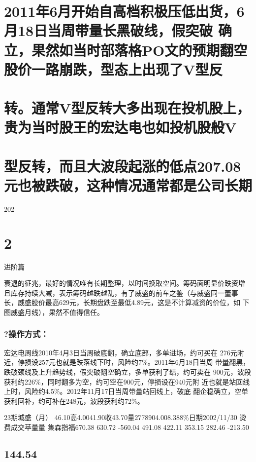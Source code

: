 \documentclass{article}
\begin{document}
\section{2011年6月开始自高档积极压低出货，6月18日当周带量长黑破线，假突破 确立，果然如当时部落格PO文的预期翻空股价一路崩跌，型态上出现了V型反}

\section{转。通常V型反转大多出现在投机股上，贵为当时股王的宏达电也如投机股般V}

\section{型反转，而且大波段起涨的低点207.08元也被跌破，这种情况通常都是公司长期}

202

\clearpage

\section{2}

进阶篇

衰退的征兆，最好的情况唯有长期整理，以时间换取空间。筹码面明显价跌资增 且库存持续大减，表示筹码越跌越乱，有了威盛的前车之鉴（与威盛同一董事 长，威盛股价最高629元，长期盘跌至最低4.89元，这是不计算减资的价位，如 下图威盛月线），果然不值得信任。

\subsubsection{?操作方式：}

宏达电周线2010年4月3日当周破底翻，确立底部，多单进场，约可买在 276元附近，停损设257元也就是跌落线下时，风险约7\%。2011年6月18日当周 带量翻黑，跌破颈线及上升趋势线，假突破翻空确立，多单获利了结，约可卖在 900元，波段获利约226\%，同时翻多为空，约可空在900元，停损设在940元附 近也就是站回线上时，风险约4.5\%。2012年11月17日当周带量站回线上，破底 翻企稳确立，空单获利回补，约可补在248元，波段获利约72\%。

23期城盛（月） 46.10高4.0041.90收43.70量2778904.008.388\%日期2002/11/30 烫费成交苹量量 集森指福670.38 630.72 -560.04 491.08 422.11 353.15 282.46 -213.50

\subsection{144.54}
\end{document}
